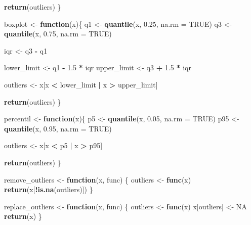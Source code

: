 \documentclass[notspecified,article,submit,moreauthors,pdftex]{Definitions/mdpi}
\newenvironment{Shaded}{\begin{snugshade}}{\end{snugshade}}
\newcommand{\AttributeTok}[1]{\textcolor[rgb]{0.13,0.29,0.53}{#1}}
\newcommand{\ConstantTok}[1]{\textcolor[rgb]{0.56,0.35,0.01}{#1}}
\newcommand{\ControlFlowTok}[1]{\textcolor[rgb]{0.13,0.29,0.53}{\textbf{#1}}}
\newcommand{\FloatTok}[1]{\textcolor[rgb]{0.00,0.00,0.81}{#1}}
\newcommand{\FunctionTok}[1]{\textcolor[rgb]{0.13,0.29,0.53}{\textbf{#1}}}
\newcommand{\NormalTok}[1]{#1}
\newcommand{\OtherTok}[1]{\textcolor[rgb]{0.56,0.35,0.01}{#1}}
\newcommand{\SpecialCharTok}[1]{\textcolor[rgb]{0.81,0.36,0.00}{\textbf{#1}}}
\begin{document}
\begin{Shaded}
\begin{Highlighting}[]
  \FunctionTok{return}\NormalTok{(outliers)}
\NormalTok{\}}

\NormalTok{boxplot }\OtherTok{\textless{}{-}} \ControlFlowTok{function}\NormalTok{(x)\{}
\NormalTok{  q1 }\OtherTok{\textless{}{-}} \FunctionTok{quantile}\NormalTok{(x, }\FloatTok{0.25}\NormalTok{, }\AttributeTok{na.rm =} \ConstantTok{TRUE}\NormalTok{)}
\NormalTok{  q3 }\OtherTok{\textless{}{-}} \FunctionTok{quantile}\NormalTok{(x, }\FloatTok{0.75}\NormalTok{, }\AttributeTok{na.rm =} \ConstantTok{TRUE}\NormalTok{)}
  
\NormalTok{  iqr }\OtherTok{\textless{}{-}}\NormalTok{ q3 }\SpecialCharTok{{-}}\NormalTok{ q1}
  
\NormalTok{  lower\_limit }\OtherTok{\textless{}{-}}\NormalTok{ q1 }\SpecialCharTok{{-}} \FloatTok{1.5} \SpecialCharTok{*}\NormalTok{ iqr}
\NormalTok{  upper\_limit }\OtherTok{\textless{}{-}}\NormalTok{ q3 }\SpecialCharTok{+} \FloatTok{1.5} \SpecialCharTok{*}\NormalTok{ iqr}
  
\NormalTok{  outliers }\OtherTok{\textless{}{-}}\NormalTok{ x[x }\SpecialCharTok{\textless{}}\NormalTok{ lower\_limit }\SpecialCharTok{|}\NormalTok{ x }\SpecialCharTok{\textgreater{}}\NormalTok{ upper\_limit]}
  
  \FunctionTok{return}\NormalTok{(outliers)}
\NormalTok{\}}

\NormalTok{percentil }\OtherTok{\textless{}{-}} \ControlFlowTok{function}\NormalTok{(x)\{}
\NormalTok{  p5 }\OtherTok{\textless{}{-}} \FunctionTok{quantile}\NormalTok{(x, }\FloatTok{0.05}\NormalTok{, }\AttributeTok{na.rm =} \ConstantTok{TRUE}\NormalTok{)}
\NormalTok{  p95 }\OtherTok{\textless{}{-}} \FunctionTok{quantile}\NormalTok{(x, }\FloatTok{0.95}\NormalTok{, }\AttributeTok{na.rm =} \ConstantTok{TRUE}\NormalTok{)}
  
\NormalTok{  outliers }\OtherTok{\textless{}{-}}\NormalTok{ x[x }\SpecialCharTok{\textless{}}\NormalTok{ p5 }\SpecialCharTok{|}\NormalTok{ x }\SpecialCharTok{\textgreater{}}\NormalTok{ p95]}
  
  \FunctionTok{return}\NormalTok{(outliers)}
\NormalTok{\}}

\NormalTok{remove\_outliers }\OtherTok{\textless{}{-}} \ControlFlowTok{function}\NormalTok{(x, func) \{}
\NormalTok{  outliers }\OtherTok{\textless{}{-}} \FunctionTok{func}\NormalTok{(x)}
  \FunctionTok{return}\NormalTok{(x[}\SpecialCharTok{!}\FunctionTok{is.na}\NormalTok{(outliers)])}
\NormalTok{\}}

\NormalTok{replace\_outliers }\OtherTok{\textless{}{-}} \ControlFlowTok{function}\NormalTok{(x, func) \{}
\NormalTok{  outliers }\OtherTok{\textless{}{-}} \FunctionTok{func}\NormalTok{(x)}
\NormalTok{  x[outliers] }\OtherTok{\textless{}{-}} \ConstantTok{NA}
  \FunctionTok{return}\NormalTok{(x)}
\NormalTok{\}}
\end{Highlighting}
\end{Shaded}
\end{document}
